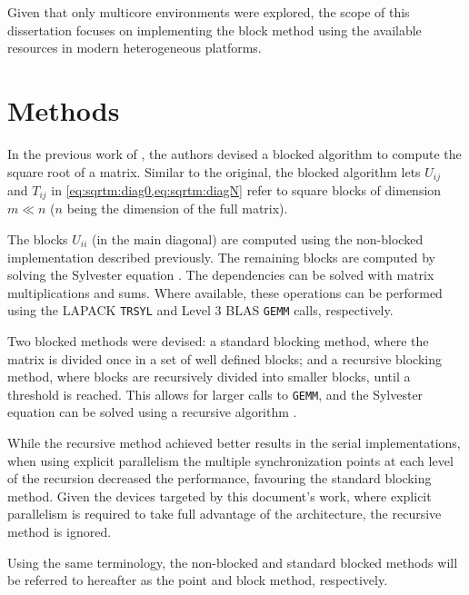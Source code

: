 \documentclass[../thesis]{subfiles}
\begin{document}
  Given that only multicore environments were explored, the scope of this dissertation focuses on implementing the block method using  the available resources in modern heterogeneous platforms.

	

	\section{Methods}
		In the previous work of \citeauthor{Deadman:Higham:Ralha:2013}\xspace\cite{Deadman:Higham:Ralha:2013}, the authors devised a blocked algorithm to compute the square root of a matrix. Similar to the original, the blocked algorithm lets $U_{ij}$ and $T_{ij}$ in \cref{eq:sqrtm:diag0,eq:sqrtm:diagN} refer to square blocks of dimension $m \ll n$ ($n$ being the dimension of the full matrix).

		The blocks $U_{ii}$ (in the main diagonal) are computed using the non-blocked implementation described previously.
		The remaining blocks are computed by solving the Sylvester equation .
		The dependencies can be solved with matrix multiplications and sums.
		Where available, these operations can be performed using the LAPACK \texttt{TRSYL} and Level 3 BLAS \texttt{GEMM} calls, respectively.

		Two blocked methods were devised: a standard blocking method, where the matrix is divided once in a set of well defined blocks; and a recursive blocking method, where blocks are recursively divided into smaller blocks, until a threshold is reached. This allows for larger calls to \texttt{GEMM}, and the Sylvester equation can be solved using a recursive algorithm \cite{Jonsson:Kagstrom:2002}.

		While the recursive method achieved better results in the serial implementations, when using explicit parallelism the multiple synchronization points at each level of the recursion decreased the performance, favouring the standard blocking method. Given the devices targeted by this document's work, where explicit parallelism is required to take full advantage of the architecture, the recursive method is ignored.

		Using the same terminology, the non-blocked and standard blocked methods will be referred to hereafter as the point and block method, respectively.

		
\end{document}
